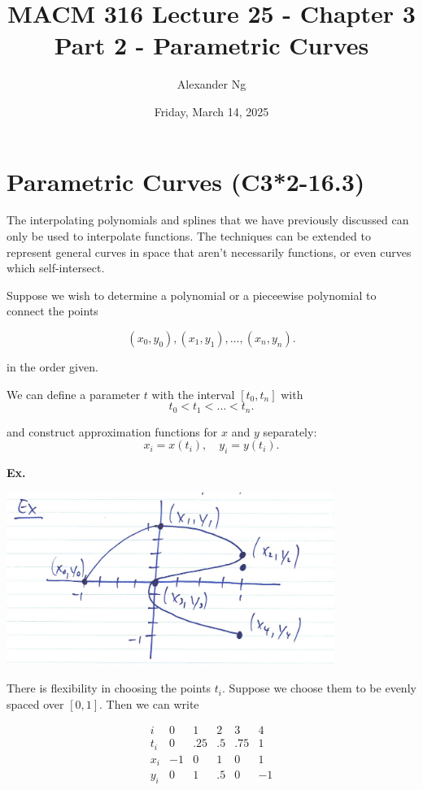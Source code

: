 \documentclass[12pt]{article}
\newcommand{\Ex}{\textbf{Ex.}\xspace}
\begin{document}
\title{MACM 316 Lecture 25 - Chapter 3 Part 2 - Parametric Curves}
\author{Alexander Ng}
\date{Friday, March 14, 2025}

\maketitle

\section{Parametric Curves (C3*2-16.3)}

The interpolating polynomials and splines that we have previously discussed can
only be used to interpolate functions. The techniques can be extended to
represent general curves in space that aren't necessarily functions, or even
curves which self-intersect. %

Suppose we wish to determine a polynomial or a pieceewise polynomial to connect
the points 

\[
(x_0, y_0), (x_1, y_1), \dots, (x_n, y_n) 
.\]

in the order given.

We can define a parameter $t$ with the interval $[t_0, t_n]$ with
\[
t_0 < t_1 < \dots < t_n
.\]

and construct approximation functions for $x$ and $y$ separately:
\[
x_i = x(t_i), \quad y_i = y(t_i)
.\]

\pagebreak
\Ex
\begin{center}
  \includegraphics[width=0.8\textwidth]{parametric_curves_1.jpg}
\end{center}

There is flexibility in choosing the points $t_i$. Suppose we choose them to be
evenly spaced over $[0, 1]$. Then we can write

\[
\begin{array}{c|ccccc}
i & 0 & 1 & 2 & 3 & 4 \\ \hline
t_i & 0 & .25 & .5 & .75 & 1 \\
x_i & -1 & 0 & 1 & 0 & 1 \\
y_i & 0 & 1 & .5 & 0 & -1
\end{array}
\]
\end{document}
